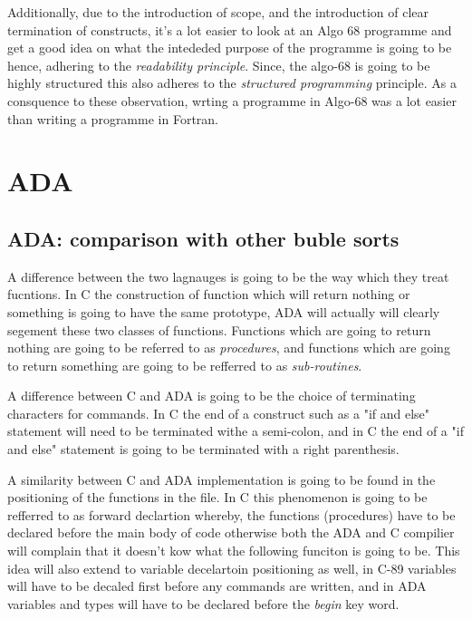 \documentclass[
	12pt, %
]{fphw}
\begin{document}
Additionally, due to the introduction of scope, and the introduction of clear
termination of constructs, it's a lot easier to look at an Algo 68 programme and
get a good idea on what the intededed purpose of the programme is going to be
hence, adhering to the \emph{readability principle}. Since, the algo-68 is going
to be highly structured this also adheres to the \emph{structured programming}
principle. As a consquence to these observation, wrting a programme in Algo-68
was a lot easier than writing a programme in Fortran.

\section{ADA}
\subsection{ADA: comparison with other buble sorts}
A difference between the two lagnauges is going to be the way which they treat
fucntions. In C the construction of function which will return nothing or something
is going to have the same prototype, ADA will actually will clearly segement these
two classes of functions. Functions which are going to return nothing are going
to be referred to as \emph{procedures}, and functions which are going to return
something are going to be refferred to as \emph{sub-routines}. \par

A difference between C and ADA is going to be the choice of terminating characters
for commands. In C the end of a construct such as a "if and else" statement will
need to be terminated withe a semi-colon, and in C the end of a "if and else"
statement is going to be terminated with a right parenthesis.\par

A similarity between C and ADA implementation is going to be found in the
positioning of the functions in the file. In C this phenomenon is going to be
refferred to as forward declartion whereby, the functions (procedures) have to
be declared before the main body of code otherwise both the ADA and C compilier
will complain that it doesn't kow what the following funciton is going to be. This
idea will also extend to variable decelartoin positioning as well, in C-89
variables will have to be decaled first before any commands are written, and in
ADA variables and types will have to be declared before the \emph{begin} key word.\par
\end{document}
